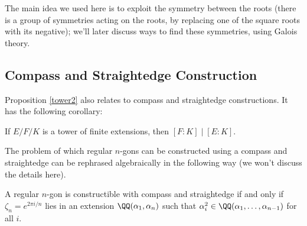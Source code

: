 The main idea we used here is to exploit the symmetry between the roots (there is a group of symmetries acting on the roots, by replacing one of the square roots with its negative); we'll later discuss ways to find these symmetries, using Galois theory. 



\subsection{Compass and Straightedge Construction}

Proposition \ref{tower2} also relates to compass and straightedge constructions. It has the following corollary:

\begin{corollary}
    If $E/F/K$ is a tower of finite extensions, then $[F : K] \mid [E : K]$. 
\end{corollary}

The problem of which regular $n$-gons can be constructed using a compass and straightedge can be rephrased algebraically in the following way (we won't discuss the details here). 

\begin{fact}
A regular $n$-gon is constructible with compass and straightedge if and only if $\zeta_n = e^{2\pi i/n}$ lies in an extension $\QQ(\alpha_1, \alpha_n)$ such that $\alpha_i^2 \in \QQ(\alpha_1, \ldots, \alpha_{n - 1})$ for all $i$.
\end{fact}

